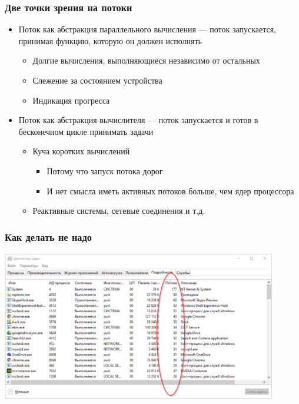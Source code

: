 \documentclass[xetex,mathserif,serif]{beamer}
\begin{document}
    \begin{frame}
        \frametitle{Две точки зрения на потоки}
        \begin{itemize}
            \item Поток как абстракция параллельного вычисления --- поток запускается, принимая функцию, которую он должен исполнять
            \begin{itemize}
                \item Долгие вычисления, выполняющиеся независимо от остальных
                \item Слежение за состоянием устройства
                \item Индикация прогресса
            \end{itemize}
            \item Поток как абстракция вычислителя --- поток запускается и готов в бесконечном цикле принимать задачи
            \begin{itemize}
                \item Куча коротких вычислений
                \begin{itemize}
                    \item Потому что запуск потока дорог
                    \item И нет смысла иметь активных потоков больше, чем ядер процессора
                \end{itemize}
                \item Реактивные системы, сетевые соединения и т.д.
            \end{itemize}
        \end{itemize}
    \end{frame}

    \begin{frame}
        \frametitle{Как делать не надо}
        \begin{center}
            \includegraphics[width=0.9\textwidth]{threadsEverywhere.png}
        \end{center}
    \end{frame}
\end{document}
